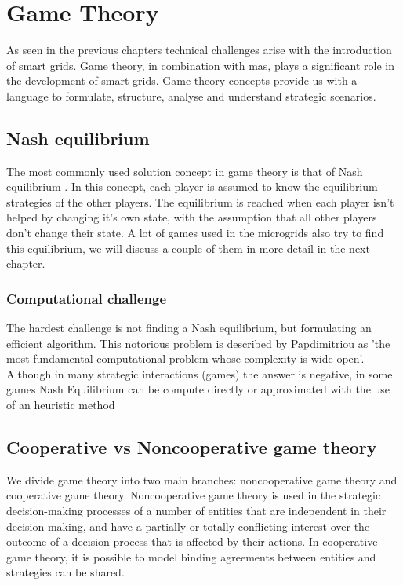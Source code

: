 \section{Game Theory}
As seen in the previous chapters technical challenges arise with the introduction of smart grids. Game theory, in combination with \gls{mas}, plays a significant role in the development of smart grids. Game theory concepts provide us with a language to formulate, structure, analyse and understand strategic scenarios.

\subsection{Nash equilibrium}
The most commonly used solution concept in game theory is that of Nash equilibrium \cite{CourseInGameTheory}. In this concept, each player is assumed to know the equilibrium strategies of the other players. The equilibrium is reached when each player isn't helped by changing it's own state, with the assumption that all other players don't change their state. A lot of games used in the microgrids also try to find this equilibrium, we will discuss a couple of them in more detail in the next chapter.

\subsubsection{Computational challenge}
The hardest challenge is not finding a Nash equilibrium, but formulating an efficient algorithm. This notorious problem is described by Papdimitriou as 'the most fundamental computational problem whose complexity is wide open'\cite{daskalakis2009complexity}. Although in many strategic interactions (games) the answer is negative, in some games Nash Equilibrium can be compute directly or approximated with the use of an heuristic method\cite{MicrogridModellingPetrosAristidou,AumannGameTheoryAccomplish} 

\subsection{Cooperative vs Noncooperative game theory} 
We divide game theory into two main branches: noncooperative game theory and cooperative game theory. Noncooperative game theory is used in the strategic decision-making processes of a number of entities that are independent in their decision making, and have a partially or totally conflicting interest over the outcome of a decision process that is affected by their actions\cite{keypaper}. In cooperative game theory, it is possible to model binding agreements between entities and strategies can be shared. 

